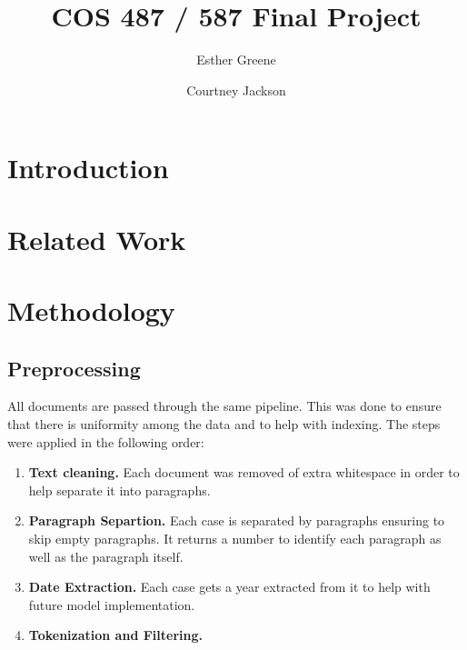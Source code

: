 \documentclass[sigconf,nonacm]{acmart}
\begin{document}
\title{COS 487 / 587 Final Project}

\author{Esther Greene}

\author{Courtney Jackson}

\begin{abstract}

\end{abstract}


\maketitle

\section{Introduction}
\cite{hearst2009search}

\section{Related Work}

\section{Methodology}
\label{sec:method}

\subsection{Preprocessing}
All documents are passed through the same pipeline. This was done to ensure that there is uniformity among the data and to help with indexing. The steps were applied in the following order:

\begin{enumerate}
  \item \textbf{Text cleaning.} Each document was removed of extra whitespace in order to help separate it into paragraphs. 
  \item \textbf{Paragraph Separtion.} Each case is separated by paragraphs ensuring to skip empty paragraphs. It returns a number to identify each paragraph as well as the paragraph itself. 
  \item \textbf{Date Extraction.} Each case gets a year extracted from it to help with future model implementation.
 \item \textbf{Tokenization and Filtering.}
\end{enumerate}
\end{document}
